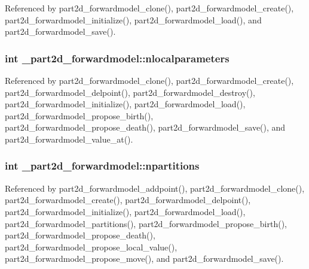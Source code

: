 Referenced by part2d\+\_\+forwardmodel\+\_\+clone(), part2d\+\_\+forwardmodel\+\_\+create(), part2d\+\_\+forwardmodel\+\_\+initialize(), part2d\+\_\+forwardmodel\+\_\+load(), and part2d\+\_\+forwardmodel\+\_\+save().

\subsubsection[{\texorpdfstring{nlocalparameters}{nlocalparameters}}]{\setlength{\rightskip}{0pt plus 5cm}int \+\_\+part2d\+\_\+forwardmodel\+::nlocalparameters}\hypertarget{struct__part2d__forwardmodel_ab8af84a58a93206e603d3dcbfa31625f}{}\label{struct__part2d__forwardmodel_ab8af84a58a93206e603d3dcbfa31625f}


Referenced by part2d\+\_\+forwardmodel\+\_\+clone(), part2d\+\_\+forwardmodel\+\_\+create(), part2d\+\_\+forwardmodel\+\_\+delpoint(), part2d\+\_\+forwardmodel\+\_\+destroy(), part2d\+\_\+forwardmodel\+\_\+initialize(), part2d\+\_\+forwardmodel\+\_\+load(), part2d\+\_\+forwardmodel\+\_\+propose\+\_\+birth(), part2d\+\_\+forwardmodel\+\_\+propose\+\_\+death(), part2d\+\_\+forwardmodel\+\_\+save(), and part2d\+\_\+forwardmodel\+\_\+value\+\_\+at().

\subsubsection[{\texorpdfstring{npartitions}{npartitions}}]{\setlength{\rightskip}{0pt plus 5cm}int \+\_\+part2d\+\_\+forwardmodel\+::npartitions}\hypertarget{struct__part2d__forwardmodel_adf0f59d428b122c2b1937a33f56ddaa1}{}\label{struct__part2d__forwardmodel_adf0f59d428b122c2b1937a33f56ddaa1}


Referenced by part2d\+\_\+forwardmodel\+\_\+addpoint(), part2d\+\_\+forwardmodel\+\_\+clone(), part2d\+\_\+forwardmodel\+\_\+create(), part2d\+\_\+forwardmodel\+\_\+delpoint(), part2d\+\_\+forwardmodel\+\_\+initialize(), part2d\+\_\+forwardmodel\+\_\+load(), part2d\+\_\+forwardmodel\+\_\+partitions(), part2d\+\_\+forwardmodel\+\_\+propose\+\_\+birth(), part2d\+\_\+forwardmodel\+\_\+propose\+\_\+death(), part2d\+\_\+forwardmodel\+\_\+propose\+\_\+local\+\_\+value(), part2d\+\_\+forwardmodel\+\_\+propose\+\_\+move(), and part2d\+\_\+forwardmodel\+\_\+save().

